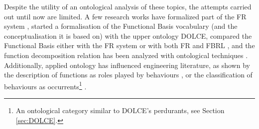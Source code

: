 \documentclass[sw]{iosart2x}
\newcommand{\DOLCE}{\textsc{DOLCE}\xspace} %
\begin{document}

Despite the utility of an ontological analysis of these topics, the attempts carried out until now are limited. 
A few research works have formalized part of the FR system \cite{borgoFormalOntologicalPerspective2009}, started a formalisation of the Functional Basis vocabulary (and the conceptualisation it is based on) with the upper ontology \DOLCE \cite{borgoFormalizationFunctionsOperations2011}, compared the Functional Basis either with the FR system \cite{garbaczTwoOntologydrivenFormalisations2011} or with both FR and FBRL \cite{kitamuraDeepSemanticMapping2008}, and the function decomposition relation has been analyzed with ontological techniques \cite{vermaasFunctionalDecompositionMereology2009a,vermaasFormalImpossibilityAnalysing2013}. 
Additionally, applied ontology has influenced engineering literature, as shown by the description of functions as roles played by behaviours \cite{mizoguchiUnifyingDefinitionArtifact2016, kitamuraOntologicalModelDevice2006, chandrasekaranFunctionDeviceRepresentation2000}, or the classification of behaviours as occurrents\footnote{An ontological category similar to \DOLCE's perdurants, see Section \ref{sec:DOLCE}.}  \cite{kitamuraOntologicalModelDevice2006}.
\end{document}
